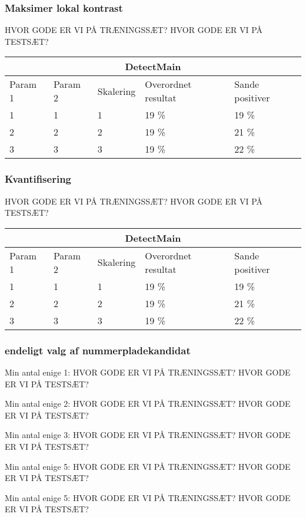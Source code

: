 \subsubsection{Maksimer lokal kontrast}
HVOR GODE ER VI PÅ TRÆNINGSSÆT?
HVOR GODE ER VI PÅ TESTSÆT?

\begin{tabular}{|l|l|l|l|l|}
\hline
\multicolumn{5}{|c|}{DetectMain} \\ \hline
Param 1 & Param 2 & Skalering & Overordnet resultat & Sande positiver\\ \hline
1 & 1 & 1 & 19 \% & 19 \%\\ \hline
2 & 2 & 2 & 19 \% & 21 \% \\ \hline
3 & 3 & 3 & 19 \% & 22 \% \\
\hline
\end{tabular}

\subsubsection{Kvantifisering}
HVOR GODE ER VI PÅ TRÆNINGSSÆT?
HVOR GODE ER VI PÅ TESTSÆT?

\begin{tabular}{|l|l|l|l|l|}
\hline
\multicolumn{5}{|c|}{DetectMain} \\ \hline
Param 1 & Param 2 & Skalering & Overordnet resultat & Sande positiver\\ \hline
1 & 1 & 1 & 19 \% & 19 \%\\ \hline
2 & 2 & 2 & 19 \% & 21 \% \\ \hline
3 & 3 & 3 & 19 \% & 22 \% \\
\hline
\end{tabular}

\subsubsection{endeligt valg af nummerpladekandidat}

Min antal enige 1:
HVOR GODE ER VI PÅ TRÆNINGSSÆT?
HVOR GODE ER VI PÅ TESTSÆT?


Min antal enige 2:
HVOR GODE ER VI PÅ TRÆNINGSSÆT?
HVOR GODE ER VI PÅ TESTSÆT?

Min antal enige 3:
HVOR GODE ER VI PÅ TRÆNINGSSÆT?
HVOR GODE ER VI PÅ TESTSÆT?

Min antal enige 5:
HVOR GODE ER VI PÅ TRÆNINGSSÆT?
HVOR GODE ER VI PÅ TESTSÆT?

Min antal enige 5:
HVOR GODE ER VI PÅ TRÆNINGSSÆT?
HVOR GODE ER VI PÅ TESTSÆT?

